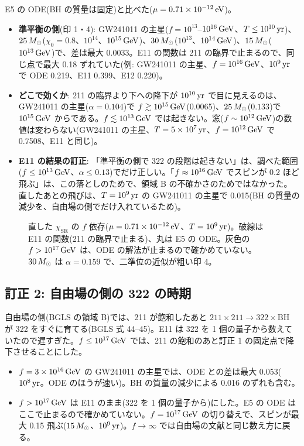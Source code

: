 \begin{result}
E5 の ODE(BH の質量は固定)と比べた($\mu=0.71\times10^{-12}\,\mathrm{eV}$)。
\begin{itemize}
\item \textbf{準平衡の側}(印 1・4): GW241011 の主星($f=10^{13}$--$10^{16}\,\mathrm{GeV}$、$T\le10^{10}\,\mathrm{yr}$)、$25\,M_\odot$($\chi_0=0.8$、$10^{14}$、$10^{15}\,\mathrm{GeV}$)、$30\,M_\odot$($10^{13}$、$10^{14}\,\mathrm{GeV}$)、$15\,M_\odot$($10^{13}\,\mathrm{GeV}$)で、差は最大 0.0033。E11 の関数は 211 の臨界で止まるので、同じ点で最大 0.18 ずれていた(例: GW241011 の主星、$f=10^{16}\,\mathrm{GeV}$、$10^9\,\mathrm{yr}$ で ODE 0.219、E11 0.399、E12 0.220)。
\item \textbf{どこで効くか}: 211 の臨界より下への降下が $10^{10}\,\mathrm{yr}$ で目に見えるのは、GW241011 の主星($\alpha=0.104$)で $f\gtrsim10^{15}\,\mathrm{GeV}$(0.0065)、$25\,M_\odot$($0.133$)で $10^{15}\,\mathrm{GeV}$ からである。$f\lesssim10^{13}\,\mathrm{GeV}$ では起きない。窓($f\sim10^{12}\,\mathrm{GeV}$)の数値は変わらない(GW241011 の主星、$T=5\times10^7\,\mathrm{yr}$、$f=10^{12}\,\mathrm{GeV}$ で 0.7508、E11 と同じ)。
\item \textbf{E11 の結果の訂正}: 「準平衡の側で 322 の段階は起きない」は、調べた範囲($f\le10^{13}\,\mathrm{GeV}$、$\alpha\le0.13$)でだけ正しい。「$f\approx10^{16}\,\mathrm{GeV}$ でスピンが 0.2 ほど飛ぶ」は、この落としのためで、領域 B の不確かさのためではなかった。直したあとの飛びは、$T=10^9\,\mathrm{yr}$ の GW241011 の主星で 0.015(BH の質量の減少を、自由場の側でだけ入れているため)。
\end{itemize}
\end{result}

\begin{figure}[H]
\centering

\caption{直した $\chi_\mathrm{SR}$ の $f$ 依存($\mu=0.71\times10^{-12}\,\mathrm{eV}$、$T=10^9\,\mathrm{yr}$)。破線は E11 の関数(211 の臨界で止まる)、丸は E5 の ODE。灰色の $f>10^{17}\,\mathrm{GeV}$ は、ODE の解法が止まるので確かめていない。$30\,M_\odot$ は $\alpha=0.159$ で、二準位の近似が粗い印 4。}
\label{fig:e12}
\end{figure}

\subsection{訂正 2: 自由場の側の 322 の時期}

自由場の側(BGLS の領域 B)では、211 が飽和したあと $211\times211\to322\times\mathrm{BH}$ が 322 をすぐに育てる(BGLS 式 44--45)。E11 は 322 を 1 個の量子から数えていたので遅すぎた。$f\le10^{17}\,\mathrm{GeV}$ では、211 の飽和のあと訂正 1 の固定点で降下させることにした。
\begin{itemize}
\item $f=3\times10^{16}\,\mathrm{GeV}$ の GW241011 の主星では、ODE との差は最大 0.053($10^8\,\mathrm{yr}$。ODE のほうが速い)。BH の質量の減少による 0.016 のずれも含む。
\item $f>10^{17}\,\mathrm{GeV}$ は E11 のまま(322 を 1 個の量子から)にした。E5 の ODE はここで止まるので確かめていない。$f=10^{17}\,\mathrm{GeV}$ の切り替えで、スピンが最大 0.15 飛ぶ($15\,M_\odot$、$10^9\,\mathrm{yr}$)。$f\to\infty$ では自由場の文献と同じ数え方に戻る。
\end{itemize}

